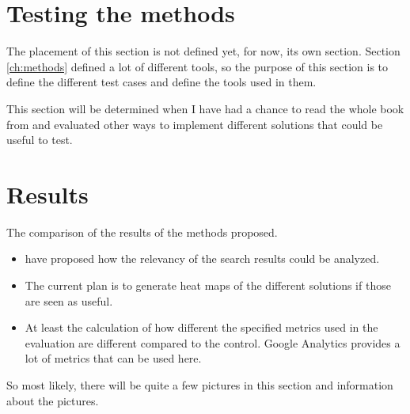 \chapter{Testing the methods}
\label{ch:testmethods}
The placement of this section is not defined yet, for now, its own section.
Section \ref{ch:methods} defined a lot of different tools, so the purpose of this section is to define the different test cases and define the tools used in them.

This section will be determined when I have had a chance to read the whole book from \citeauthor{relevantSearch} \cite{relevantSearch} and 
evaluated other ways to implement different solutions that could be useful to test.


\chapter{Results}

The comparison of the results of the methods proposed.


\begin{itemize}
    \item \citeauthor{relevantSearch} \cite{relevantSearch} have proposed how the relevancy of the search results could be analyzed. 
    
    \item The current plan is to generate heat maps of the different solutions if those are seen as useful.

    \item At least the calculation of how different the specified metrics used in the evaluation are different compared to the control.
    Google Analytics provides a lot of metrics that can be used here.     
\end{itemize}

So most likely, there will be quite a few pictures in this section and information about the pictures. \cite{analyticsAbout}


